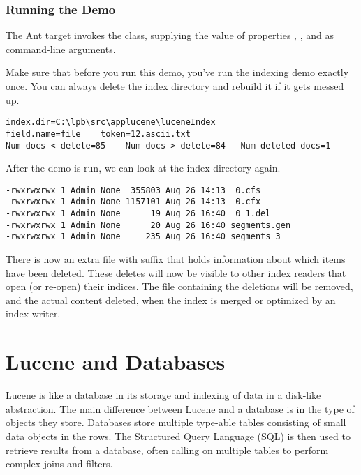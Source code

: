 \subsubsection{Running the Demo}

The Ant target  invokes the class, supplying
the value of properties , , and
 as command-line arguments.  

Make sure that before you run this demo, you've run the indexing
demo exactly once.  You can always delete the index directory and
rebuild it if it gets messed up.
%
\begin{verbatim}
index.dir=C:\lpb\src\applucene\luceneIndex 
field.name=file    token=12.ascii.txt  
Num docs < delete=85    Num docs > delete=84   Num deleted docs=1
\end{verbatim}

After the demo is run, we can look at the index directory again.
%
\begin{verbatim}
-rwxrwxrwx 1 Admin None  355803 Aug 26 14:13 _0.cfs
-rwxrwxrwx 1 Admin None 1157101 Aug 26 14:13 _0.cfx
-rwxrwxrwx 1 Admin None      19 Aug 26 16:40 _0_1.del
-rwxrwxrwx 1 Admin None      20 Aug 26 16:40 segments.gen
-rwxrwxrwx 1 Admin None     235 Aug 26 16:40 segments_3
\end{verbatim}
%
There is now an extra file with suffix  that holds
information about which items have been deleted.  These deletes will
now be visible to other index readers that open (or re-open) their
indices.  The file containing the deletions will be removed, and the
actual content deleted, when the index is merged or optimized by an
index writer.


\section{Lucene and Databases}

Lucene is like a database in its storage and indexing of data in a
disk-like abstraction.  The main difference between Lucene and a
database is in the type of objects they store.  Databases store
multiple type-able tables consisting of small data objects in the
rows.  The Structured Query Language (SQL) is then used to retrieve
results from a database, often calling on multiple tables to perform
complex joins and filters.  

